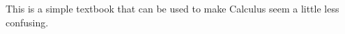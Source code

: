 \documentclass[../main.tex]{subfiles}
\begin{document}
\par    This is a simple textbook that can be used to make Calculus seem a little less confusing.
\end{document}
